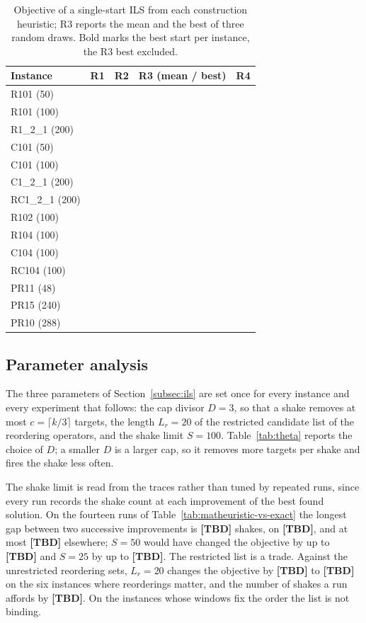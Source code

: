 \documentclass[11pt]{article}
\newcommand{\tbd}{\textbf{[TBD]}}   %
\let\originalsubsection\subsection
\renewcommand{\subsection}{\FloatBarrier\originalsubsection}
\begin{document}
\begin{table}[H]
\centering\small
\caption{Objective of a single-start ILS from each construction heuristic; R3 reports the mean and the best of three random draws. Bold marks the best start per instance, the R3 best excluded.}\label{tab:initial-tour}
\begin{tabular}{lrrrr}
\toprule
Instance & R1 & R2 & R3 (mean / best) & R4 \\
\midrule
R101 (50) & & & & \\
R101 (100) & & & & \\
R1\_2\_1 (200) & & & & \\
\midrule
C101 (50) & & & & \\
C101 (100) & & & & \\
C1\_2\_1 (200) & & & & \\
\midrule
RC1\_2\_1 (200) & & & & \\
\midrule
R102 (100) & & & & \\
R104 (100) & & & & \\
C104 (100) & & & & \\
RC104 (100) & & & & \\
\midrule
PR11 (48) & & & & \\
PR15 (240) & & & & \\
PR10 (288) & & & & \\
\bottomrule
\end{tabular}
\end{table}

\subsection{Parameter analysis}\label{subsec:parameter-analysis}

The three parameters of Section~\ref{subsec:ils} are set once for every instance and every experiment that follows: the cap divisor $D = 3$, so that a shake removes at most $c = \lceil k/3 \rceil$ targets, the length $L_r = 20$ of the restricted candidate list of the reordering operators, and the shake limit $S = 100$. Table~\ref{tab:theta} reports the choice of $D$; a smaller $D$ is a larger cap, so it removes more targets per shake and fires the shake less often.

The shake limit is read from the traces rather than tuned by repeated runs, since every run records the shake count at each improvement of the best found solution. On the fourteen runs of Table~\ref{tab:matheuristic-vs-exact} the longest gap between two successive improvements is \tbd{} shakes, on \tbd{}, and at most \tbd{} elsewhere; $S = 50$ would have changed the objective by up to \tbd{} and $S = 25$ by up to \tbd{}. The restricted list is a trade. Against the unrestricted reordering sets, $L_r = 20$ changes the objective by \tbd{} to \tbd{} on the six instances where reorderings matter, and the number of shakes a run affords by \tbd{}. On the instances whose windows fix the order the list is not binding.
\end{document}
